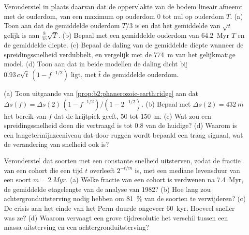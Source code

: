 \begin{exercise}[$\star\star\star$]\label{exo:b2:phanerozoic-earth:10}
Veronderstel in plaats daarvan dat de oppervlakte van de bodem lineair afneemt met de ouderdom, van een maximum op ouderdom 0 tot nul
op ouderdom $T$. (a) Toon aan dat de gemiddelde ouderdom $T/3$ is en dat het gemiddelde van $\sqrt t$ gelijk is aan
$\tfrac{8}{15}\sqrt T$. (b) Bepaal met een gemiddelde ouderdom van \qty{64.2}{Myr} $T$ en de gemiddelde diepte. (c)
Bepaal de daling van de gemiddelde diepte wanneer de spreidingssnelheid verdubbelt, en vergelijk met de
\qty{774}{m} van het gelijkmatige model. (d) Toon aan dat in beide modellen de daling dicht bij $0.93\,c\sqrt{\bar
t}\,(1 - f^{-1/2})$ ligt, met $\bar t$ de gemiddelde ouderdom.
\end{exercise}

\begin{exercise}[$\star\star\star$]\label{exo:b2:phanerozoic-earth:11}
(a) Toon uitgaande van \cref{prop:b2:phanerozoic-earth:ridge} aan dat $\Delta s(f) = \Delta s(2)\,(1 -
f^{-1/2})/(1 - 2^{-1/2})$. (b) Bepaal met $\Delta s(2) = \qty{432}{m}$ het bereik van $f$ dat
de krijtpiek geeft, 50 tot \qty{150}{m}. (c) Wat zou een spreidingssnelheid doen die vertraagd is tot 0.8 van
de huidige? (d) Waarom is een langetermijnzeeniveau dat door ruggen wordt bepaald een traag signaal, wat de verandering van
snelheid ook is?
\end{exercise}

\begin{exercise}[$\star\star\star$]\label{exo:b2:phanerozoic-earth:12}
Veronderstel dat soorten met een constante snelheid uitsterven, zodat de fractie van een cohort die een tijd
$t$ overleeft $2^{-t/m}$ is, met een mediane levensduur van een soort $m = \qty{2}{Myr}$. (a) Welke fractie van een
cohort is verdwenen na \qty{7.4}{Myr}, de gemiddelde etagelengte van de analyse van 1982? (b) Hoe lang
zou achtergronduitsterving nodig hebben om \qty{81}{\percent} van de soorten te verwijderen? (c) De crisis aan het einde van het Perm
duurde ongeveer \qty{60}{kyr}. Hoeveel sneller was ze? (d) Waarom vervaagt een grove
tijdresolutie het verschil tussen een massa-uitsterving en een achtergronduitsterving?
\end{exercise}

